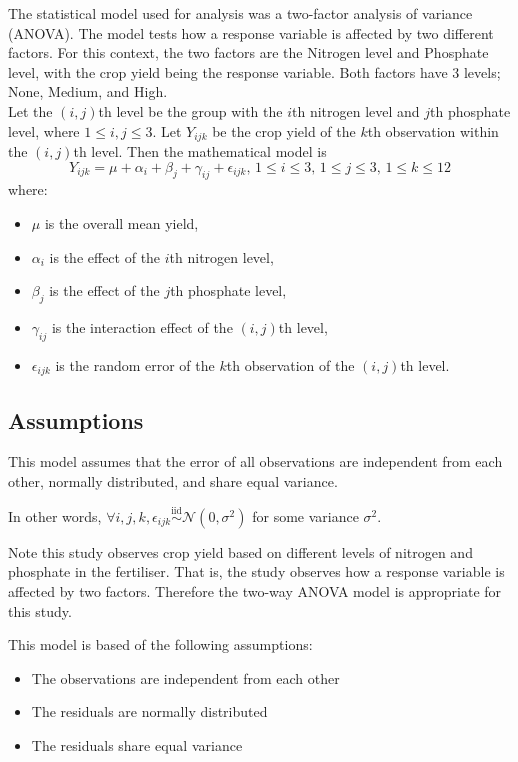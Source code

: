 \documentclass[12pt]{article}
\begin{document}
The statistical model used for analysis was a two-factor analysis of variance (ANOVA).
The model tests how a response variable is affected by two different factors.
For this context, the two factors are the Nitrogen level and Phosphate level, with the crop yield being the response variable.
Both factors have 3 levels; None, Medium, and High.\\
Let the \((i,j)\)th level be the group with the \(i\)th nitrogen level and \(j\)th phosphate level, where \(1 \leq i,j \leq 3\).
Let \(Y_{ijk}\) be the crop yield of the \(k\)th observation within the \((i,j)\)th level.
Then the mathematical model is
\[
    Y_{ijk} = \mu + \alpha_i + \beta_j + \gamma_{ij} + \epsilon_{ijk},\, 1 \leq i \leq 3,\, 1 \leq j \leq 3,\, 1 \leq k \leq 12
\]
where:
\begin{itemize}
    \item \(\mu\) is the overall mean yield,
    \item \(\alpha_i\) is the effect of the \(i\)th nitrogen level,
    \item \(\beta_j\) is the effect of the \(j\)th phosphate level,
    \item \(\gamma_{ij}\) is the interaction effect of the \((i,j)\)th level,
    \item \(\epsilon_{ijk}\) is the random error of the \(k\)th observation of the \((i,j)\)th level.
\end{itemize}

\vspace{2em}

\subsection{Assumptions}

This model assumes that the error of all observations are independent from each other, normally distributed, and share equal variance.

In other words, $\forall i, j, k, \epsilon_{ijk} \overset{\text{iid}}{\sim} \mathcal{N}(0, \sigma^2)$ for some variance $\sigma^2$.

Note this study observes crop yield based on different levels of nitrogen and phosphate in the fertiliser.
That is, the study observes how a response variable is affected by two factors.
Therefore the two-way ANOVA model is appropriate for this study.

This model is based of the following assumptions:
\begin{itemize}
    \item The observations are independent from each other
    \item The residuals are normally distributed
    \item The residuals share equal variance
\end{itemize}
\end{document}
